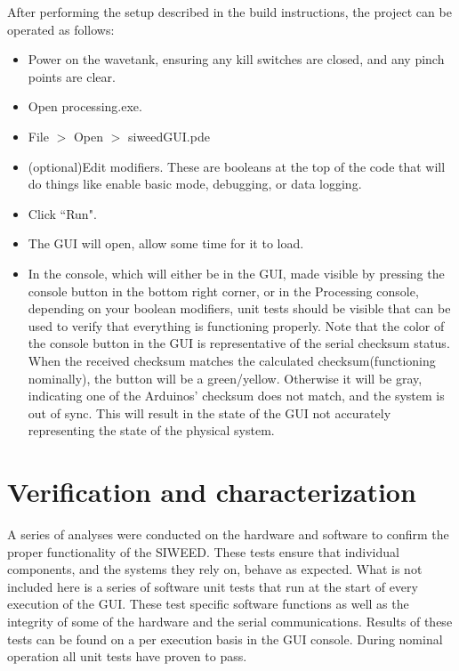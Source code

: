 \documentclass[11pt, letterpaper]{article}
\begin{document}
After performing the setup described in the build instructions, the project can be operated as follows:
\begin{itemize}
\item Power on the wavetank, ensuring any kill switches are closed, and any pinch points are clear.
\item Open processing.exe.
\item File $>$ Open $>$ siweedGUI.pde 
\item (optional)Edit modifiers. These are booleans at the top of the code that will do things like enable basic mode, debugging, or data logging.
\item Click ``Run".
\item The GUI will open, allow some time for it to load.
\item In the console, which will either be in the GUI, made visible by pressing the console button in the bottom right corner, or in the Processing console, depending on your boolean modifiers, unit tests should be visible that can be used to verify that everything is functioning properly. 
Note that the color of the console button in the GUI is representative of the serial checksum status.
When the received checksum matches the calculated checksum(functioning nominally), the button will be a green/yellow.
Otherwise it will be gray, indicating one of the Arduinos' checksum does not match, and the system is out of sync. 
This will result in the state of the GUI not accurately representing the state of the physical system.
\end{itemize}

\section{Verification and characterization}
A series of analyses were conducted on the hardware and software to confirm the proper functionality of the SIWEED.
These tests ensure that individual components, and the systems they rely on, behave as expected.
What is not included here is a series of software unit tests that run at the start of every execution of the GUI.
These test specific software functions as well as the integrity of some of the hardware and the serial communications. 
Results of these tests can be found on a per execution basis in the GUI console.
During nominal operation all unit tests have proven to pass.
\end{document}
